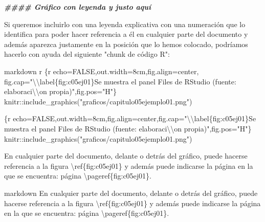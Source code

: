 \documentclass[11pt,a4paper,oneside,]{article}
\newenvironment{Shaded}{\begin{snugshade}}{\end{snugshade}}
\newcommand{\AttributeTok}[1]{\textcolor[rgb]{0.77,0.63,0.00}{#1}}
\newcommand{\DocumentationTok}[1]{\textcolor[rgb]{0.56,0.35,0.01}{\textbf{\textit{#1}}}}
\newcommand{\NormalTok}[1]{#1}
\newcommand{\SpecialCharTok}[1]{\textcolor[rgb]{0.00,0.00,0.00}{#1}}
\newcommand{\StringTok}[1]{\textcolor[rgb]{0.31,0.60,0.02}{#1}}
\numberwithin{dummy}{section}
\theoremstyle{ocrenumbox}
\theoremstyle{blacknumex}
\theoremstyle{blacknumbox}
\theoremstyle{ocrenum}
\theoremstyle{ocrenum}
\begin{document}
\begin{Shaded}
\begin{Highlighting}[numbers=left,,]
\DocumentationTok{\#\#\#\# Gráfico con leyenda y justo aquí}

\NormalTok{Si queremos incluirlo con una leyenda explicativa con una numeración que lo identifica para poder hacer referencia a él en cualquier parte del documento y además aparezca justamente en la posición que lo hemos colocado, podríamos hacerlo con ayuda del siguiente }\StringTok{"chunk de código R"}\SpecialCharTok{:}

\StringTok{\textasciigrave{}\textasciigrave{}\textasciigrave{}\textasciigrave{}}\NormalTok{markdown}
\StringTok{\textasciigrave{}}\AttributeTok{r \textquotesingle{}\textquotesingle{}}\StringTok{\textasciigrave{}\textasciigrave{}\textasciigrave{}\textasciigrave{}}\AttributeTok{\{r echo=FALSE,out.width=\textquotesingle{}8cm\textquotesingle{},fig.align=\textquotesingle{}center\textquotesingle{},}
\AttributeTok{fig.cap="}\SpecialCharTok{\textbackslash{}\textbackslash{}}\AttributeTok{label\{fig:c05ej01\}Se muestra el panel Files de RStudio }
\AttributeTok{(fuente: elaboraci}\SpecialCharTok{\textbackslash{}\textbackslash{}}\AttributeTok{\textquotesingle{}on propia)",fig.pos="H"\}}
\AttributeTok{knitr::include\_graphics("graficos/capitulo05ejemplo01.png")}
\StringTok{\textasciigrave{}\textasciigrave{}\textasciigrave{}}

\StringTok{\textasciigrave{}\textasciigrave{}\textasciigrave{}\textasciigrave{}}

\StringTok{\textasciigrave{}\textasciigrave{}\textasciigrave{}}\AttributeTok{\{r echo=FALSE,out.width=\textquotesingle{}8cm\textquotesingle{},fig.align=\textquotesingle{}center\textquotesingle{},fig.cap="}\SpecialCharTok{\textbackslash{}\textbackslash{}}\AttributeTok{label\{fig:c05ej01\}Se muestra el panel Files de RStudio (fuente: elaboraci}\SpecialCharTok{\textbackslash{}\textbackslash{}}\AttributeTok{\textquotesingle{}on propia)",fig.pos="H"\}}
\AttributeTok{knitr::include\_graphics("graficos/capitulo05ejemplo01.png")}
\StringTok{\textasciigrave{}\textasciigrave{}\textasciigrave{}}


\NormalTok{En cualquier parte del documento, delante o detrás del gráfico, puede }
\NormalTok{hacerse referencia a la figura \textbackslash{}ref\{fig}\SpecialCharTok{:}\NormalTok{c05ej01\} y además puede indicarse }
\NormalTok{la página en la que se encuentra}\SpecialCharTok{:}\NormalTok{ página \textbackslash{}pageref\{fig}\SpecialCharTok{:}\NormalTok{c05ej01\}.}

\StringTok{\textasciigrave{}\textasciigrave{}\textasciigrave{}\textasciigrave{}}\NormalTok{markdown}
\NormalTok{En cualquier parte del documento, delante o detrás del gráfico, puede }
\NormalTok{hacerse referencia a la figura \textbackslash{}ref\{fig}\SpecialCharTok{:}\NormalTok{c05ej01\} y además puede indicarse }
\NormalTok{la página en la que se encuentra}\SpecialCharTok{:}\NormalTok{ página \textbackslash{}pageref\{fig}\SpecialCharTok{:}\NormalTok{c05ej01\}.}
\StringTok{\textasciigrave{}\textasciigrave{}\textasciigrave{}\textasciigrave{}}



\end{Highlighting}
\end{Shaded}
\end{document}
